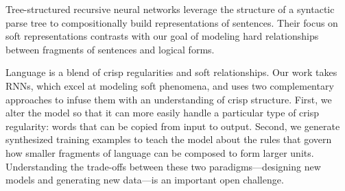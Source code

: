 \documentclass[11pt,letterpaper]{article}
\begin{document}
Tree-structured recursive neural networks \cite{socher2012mvrnn,socher2013recursive}
leverage the structure of a syntactic parse tree
to compositionally build representations of sentences.
Their focus on soft representations
contrasts with our goal of modeling hard relationships between
fragments of sentences and logical forms.

Language is a blend of crisp regularities and soft relationships.
Our work takes RNNs, which excel at modeling soft phenomena,
and uses two complementary approaches 
to infuse them with an understanding of crisp structure.
First, we alter the model so that it can more easily
handle a particular type of crisp regularity: words
that can be copied from input to output.
Second, we generate synthesized training examples
to teach the model about the rules that govern how
smaller fragments of language can be composed to form larger units.
Understanding the trade-offs between
these two paradigms---designing new models and 
generating new data---is an important open challenge.





\end{document}

